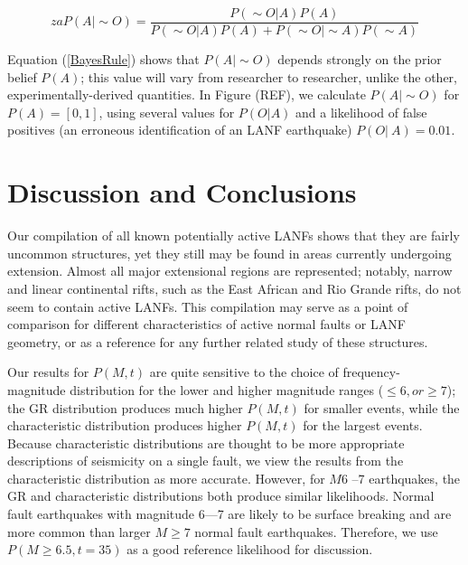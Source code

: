 \documentclass[twocolumn,grl]{AGUTeX}
\begin{document}
\begin{article}
\begin{equation}za
P(A | \sim O) = \frac{P(\sim O|A) P(A)}
{P(\sim O|A)P(A) + P(\sim O|\sim A)P(\sim A)}
\label{BayesRule}
\end{equation}

Equation (\ref{BayesRule}) shows that $P(A|\sim O)$
depends strongly on the prior belief $P(A)$; this value will vary from
researcher to researcher, unlike the other, experimentally-derived quantities.
In Figure (REF), we calculate $P(A|\sim O)$ for $P(A) = [0,1]$, using several
values for $P(O|A)$ and a likelihood of false positives (an erroneous
identification of an LANF earthquake) $P(O|~A)= 0.01$.  

\section{Discussion and Conclusions}

Our compilation of all known potentially active LANFs shows that they 
are fairly uncommon structures, yet they still may be found in areas 
currently undergoing extension. Almost all major extensional regions are
represented; notably, narrow and linear continental rifts, such as 
the East African and Rio Grande rifts, do not seem to contain active LANFs.
This compilation may serve as a point of comparison for different
characteristics of active normal faults or LANF geometry, or as a
reference for any further related study of these structures.

Our results for $P(M,t)$ are quite sensitive to the choice of 
 frequency- magnitude distribution for the lower and higher magnitude ranges ($\le 6, or
\ge 7$); the GR distribution produces much higher $P(M,t)$ for smaller events,
while the characteristic distribution produces higher $P(M,t)$ for the largest
events.  Because characteristic distributions are thought to be more
appropriate descriptions of seismicity on a single fault, we view the results
from the characteristic distribution as more accurate.
However, for $M6$ --7 earthquakes, the GR and characteristic 
distributions both produce similar likelihoods. Normal fault earthquakes with magnitude 6—7 are likely to be surface breaking and are more common than larger $M \ge 7$ normal fault earthquakes.  Therefore, we use $P(M\ge6.5, t=35)$ as a good reference
likelihood for discussion.


\end{article}
\end{document}
